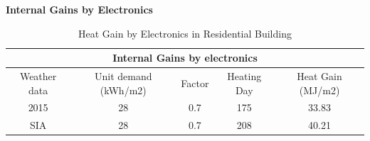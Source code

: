 \documentclass[a4paper, oneside]{discothesis}
\begin{document}
		\textbf{Internal Gains by Electronics}\\
		\begin{table}[htbp]
		\centering
		\caption{Heat Gain by Electronics in Residential Building}
		    \begin{tabular}{ccccc}
		    \toprule
		    \multicolumn{5}{c}{Internal Gains by electronics} \\
		    \midrule
		    \multicolumn{1}{p{5.355em}}{Weather data} & \multicolumn{1}{p{5.355em}}{Unit demand (kWh/m2)} & \multicolumn{1}{p{5.355em}}{Factor} & \multicolumn{1}{p{5.355em}}{Heating Day} & \multicolumn{1}{p{5.355em}}{Heat Gain (MJ/m2)} \\
		    2015  & 28    & 0.7   & 175   & 33.83 \\
		    SIA   & 28    & 0.7   & 208   & 40.21 \\
		    \bottomrule
		    \end{tabular}%
		  \label{tab:HonggElecGain}%
		\end{table}%
\end{document}
